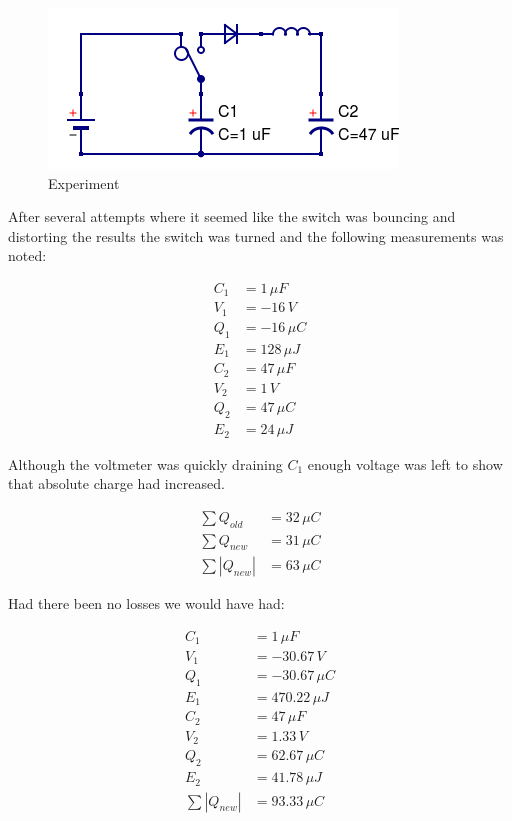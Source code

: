 \documentclass[]{../common/elementary-physics}
\begin{document}
\begin{figure}[ht] \centering
	\includegraphics[scale=.5]{BLCC} \caption{Experiment}
\end{figure}

After several attempts where it seemed like the switch was bouncing and distorting the results the switch was turned and the following measurements was noted:

\begin{subequations}
\begin{align}
C_1 &= 1 \, \mu F \\
V_1 &= -16 \, V \\
Q_1 &= -16 \, \mu C \\
E_1 &= 128 \, \mu J \\
C_2 &= 47 \, \mu F \\
V_2 &= 1 \, V \\
Q_2 &= 47 \, \mu C \\
E_2 &= 24 \, \mu J
\end{align}
\end{subequations}

Although the voltmeter was quickly draining $C_1$ enough voltage was left to show that absolute charge had increased.

\begin{subequations}
\begin{align}
\sum Q_{old} &= 32 \, \mu C \\
\sum Q_{new} &= 31 \, \mu C \\
\sum |Q_{new}| &= 63 \, \mu C
\end{align}
\end{subequations}

Had there been no losses we would have had:

\begin{subequations}
\begin{align}
C_1 &= 1 \, \mu F \\
V_1 &= -30.67 \, V \\
Q_1 &= -30.67 \, \mu C \\
E_1 &= 470.22 \, \mu J \\
C_2 &= 47 \, \mu F \\
V_2 &= 1.33 \, V \\
Q_2 &= 62.67 \, \mu C \\
E_2 &= 41.78 \, \mu J \\
\sum |Q_{new}| &= 93.33 \, \mu C
\end{align}
\end{subequations}
\end{document}

